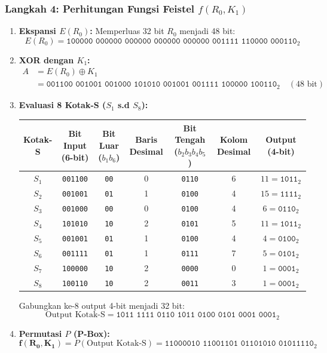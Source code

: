 \documentclass[11pt,a4paper]{article}
\begin{document}
\subsubsection*{Langkah 4: Perhitungan Fungsi Feistel $f(R_0, K_1)$}
\begin{enumerate}[leftmargin=*]
    \item \textbf{Ekspansi $E(R_0)$:} Memperluas 32 bit $R_0$ menjadi 48 bit:
    \begin{equation*}
    E(R_0) = \texttt{100000 000000 000000 000000 000000 001111 110000 000110}_2
    \end{equation*}
    \item \textbf{XOR dengan $K_1$:}
    \begin{align*}
    A &= E(R_0) \oplus K_1 \\
    &= \texttt{001100 001001 001000 101010 001001 001111 100000 100110}_2 \quad (48\text{ bit})
    \end{align*}
    \item \textbf{Evaluasi 8 Kotak-S ($S_1$ s.d $S_8$):}
    \begin{table}[H]
    \centering
    \small
    \begin{tabular}{ccccccc}
    \toprule
    \textbf{Kotak-S} & \textbf{Bit Input (6-bit)} & \textbf{Bit Luar ($b_1 b_6$)} & \textbf{Baris Desimal} & \textbf{Bit Tengah ($b_2 b_3 b_4 b_5$)} & \textbf{Kolom Desimal} & \textbf{Output (4-bit)} \\
    \midrule
    $S_1$ & \texttt{001100} & \texttt{00} & 0 & \texttt{0110} & 6  & $11 = \texttt{1011}_2$ \\
    $S_2$ & \texttt{001001} & \texttt{01} & 1 & \texttt{0100} & 4  & $15 = \texttt{1111}_2$ \\
    $S_3$ & \texttt{001000} & \texttt{00} & 0 & \texttt{0100} & 4  & $6 = \texttt{0110}_2$ \\
    $S_4$ & \texttt{101010} & \texttt{10} & 2 & \texttt{0101} & 5  & $11 = \texttt{1011}_2$ \\
    $S_5$ & \texttt{001001} & \texttt{01} & 1 & \texttt{0100} & 4  & $4 = \texttt{0100}_2$ \\
    $S_6$ & \texttt{001111} & \texttt{01} & 1 & \texttt{0111} & 7  & $5 = \texttt{0101}_2$ \\
    $S_7$ & \texttt{100000} & \texttt{10} & 2 & \texttt{0000} & 0  & $1 = \texttt{0001}_2$ \\
    $S_8$ & \texttt{100110} & \texttt{10} & 2 & \texttt{0011} & 3  & $1 = \texttt{0001}_2$ \\
    \bottomrule
    \end{tabular}
    \end{table}
    Gabungkan ke-8 output 4-bit menjadi 32 bit:
    \begin{equation*}
    \text{Output Kotak-S} = \texttt{1011 1111 0110 1011 0100 0101 0001 0001}_2
    \end{equation*}
    \item \textbf{Permutasi $P$ (P-Box):}
    \begin{equation*}
    \mathbf{f(R_0, K_1)} = P(\text{Output Kotak-S}) = \texttt{11000010 11001101 01101010 01011110}_2
    \end{equation*}
\end{enumerate}
\end{document}

